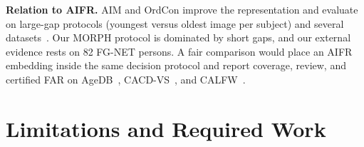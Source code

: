 \documentclass[journal]{IEEEtran}
\begin{document}
\textbf{Relation to AIFR.} AIM and OrdCon improve the representation and evaluate on large-gap protocols (youngest versus oldest image per subject) and several datasets~\cite{zhao2022aim,wang2025ordcon}. Our MORPH protocol is dominated by short gaps, and our external evidence rests on 82 FG-NET persons. A fair comparison would place an AIFR embedding inside the same decision protocol and report coverage, review, and certified FAR on AgeDB~\cite{moschoglou2017agedb}, CACD-VS~\cite{chen2014cacd}, and CALFW~\cite{zheng2017calfw}.

\section{Limitations and Required Work}
\label{sec:limitations}
\end{document}
